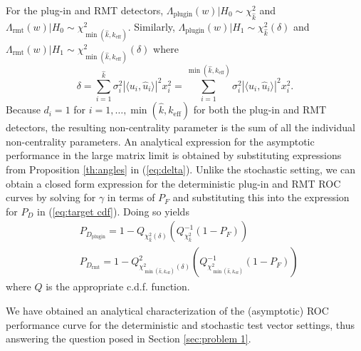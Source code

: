 For the plug-in and RMT detectors, $\Lambda_\text{plugin}(w)|H_0\sim\chi_{\widehat{k}}^2$ and $\Lambda_\text{rmt}(w)|H_0\sim\chi_{\min(\widehat{k},k_\text{eff})}^2$. Similarly, $\Lambda_\text{plugin}(w)|H_1\sim\chi_{\widehat{k}}^2(\delta)$ and $\Lambda_\text{rmt}(w)|H_1\sim\chi_{\min(\widehat{k},k_\text{eff})}^2(\delta)$ where
\begin{equation}\label{eq:delta}
\delta=\sum_{i=1}^{\widehat{k}}\sigma_i^2|\langle u_i,\widehat{u}_i\rangle|^2x_i^2=\sum_{i=1}^{\min(\widehat{k},k_\text{eff})}\sigma_i^2|\langle u_i,\widehat{u}_i\rangle|^2x_i^2.
 \end{equation}
Because $d_i=1$ for $i=1,\dots,\min(\widehat{k},k_\text{eff})$ for both the plug-in and RMT detectors, the resulting non-centrality parameter is the sum of all the individual non-centrality parameters. An analytical expression for the asymptotic performance in the large matrix limit  is obtained by substituting expressions from Proposition \ref{th:angles} in (\ref{eq:delta}). Unlike the stochastic setting, we can obtain a closed form expression for the deterministic plug-in and RMT ROC curves by solving for $\gamma$ in terms of $P_F$ and substituting this into the expression for $P_D$  in (\ref{eq:target cdf}). Doing so yields
\begin{equation}\label{eq:roc}
\begin{aligned}
&P_{D_\text{plugin}}=1-Q_{\chi_{\widehat{k}}^2(\delta)}\left(Q^{-1}_{\chi^2_{\widehat{k}}}\left(1-P_F\right)\right)\\
&P_{D_\text{rmt}}=1-Q_{\chi_{\min(\widehat{k},k_\text{eff})}^2(\delta)}^2\left(Q^{-1}_{\chi^2_{\min(\widehat{k},k_\text{eff})}}\left(1-P_F\right)\right)
\end{aligned}
\end{equation}
where $Q$ is the appropriate c.d.f. function.

We have obtained an analytical characterization of the (asymptotic) ROC performance curve for the deterministic and stochastic test vector settings, thus answering the question posed in Section \ref{sec:problem 1}.
